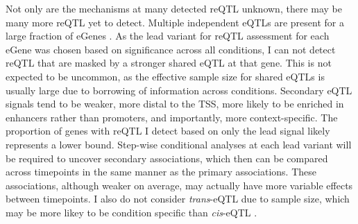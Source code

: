 Not only are the mechanisms at many detected reQTL unknown, there may be many more reQTL yet to detect.
%
Multiple independent eQTLs are present for a large fraction of eGenes \autocite{zeng2019ComprehensiveMultipleEQTL}.
As the lead variant for reQTL assessment for each eGene was chosen based on significance across all conditions, I can not detect reQTL that are masked by a stronger shared eQTL at that gene.
This is not expected to be uncommon, as the effective sample size for shared eQTLs is usually large due to borrowing of information across conditions.
Secondary \gls{eQTL} signals tend to be weaker, more distal to the TSS, more likely to be enriched in enhancers rather than promoters, and importantly, more context-specific\autocite{vandiedonck2017GeneticAssociationMolecular,dobbyn2018LandscapeConditionalEQTL,rotival2019CharacterisingGeneticBasis}.
The proportion of genes with reQTL I detect based on only the lead signal likely represents a lower bound.
Step-wise conditional analyses at each lead variant will be required to uncover secondary associations, 
which then can be compared across timepoints in the same manner as the primary associations.
These associations, although weaker on average, may actually have more variable effects between timepoints.
I also do not consider \textit{trans}-\gls{eQTL} due to sample size, which may be more likey to be condition specific than \textit{cis}-\gls{eQTL} \autocite{fairfax2012GeneticsGeneExpression,westra2014GenomeFunctionStudying,fairfax2014InnateImmuneActivity}.

